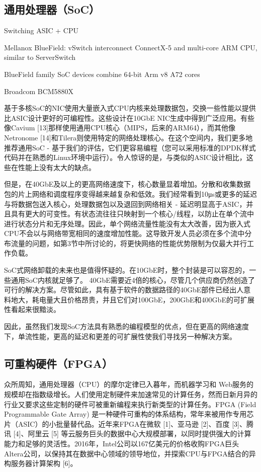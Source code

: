 \subsection{通用处理器（SoC）}
\label{smartnic-soc}

Switching ASIC + CPU

Mellanox BlueField: vSwitch interconnect ConnectX-5 and multi-core ARM CPU, similar to ServerSwitch

BlueField family SoC devices combine 64-bit Arm v8 A72 cores

Broadcom BCM5880X


基于多核SoC的NIC使用大量嵌入式CPU内核来处理数据包，交换一些性能以提供比ASIC设计更好的可编程性。这些设计在10GbE NIC生成中得到广泛应用。有些像Cavium [13]那样使用通用CPU核心（MIPS，后来的ARM64），而其他像Netronome [14]和Tilera则使用特定的网络处理核心。在这个空间内，我们更多地推荐通用SoC  - 基于我们的评估，它们更容易编程（您可以采用标准的DPDK样式代码并在熟悉的Linux环境中运行）。令人惊讶的是，与类似的ASIC设计相比，这些在性能上没有太大的缺点。

但是，在40GbE及以上的更高网络速度下，核心数量显着增加。分散和收集数据包的片上网络和调度程序变得越来越复杂和低效。我们经常看到10μs或更多的延迟与将数据包送入核心，处理数据包以及退回到网络相关 - 延迟明显高于ASIC，并且具有更大的可变性。有状态流往往只映射到一个核心/线程，以防止在单个流中进行状态分片和无序处理。因此，单个网络流量性能没有太大改善，因为嵌入式CPU不会以与网络带宽相同的速度增加性能。这导致开发人员必须在多个流中分布流量的问题，如第3节中所讨论的，将更快网络的性能优势限制为仅最大并行工作负载。

SoC式网络卸载的未来也是值得怀疑的。在10GbE时，整个封装是可以容忍的，一些通用SoC内核就足够了。 40GbE需要近4倍的核心，尽管几个供应商仍然创造了可行的解决方案。尽管如此，具有基于软件的数据路径的40GbE部件已经出人意料地大，耗电量大且价格昂贵，并且它们对100GbE，200GbE和400GbE的可扩展性看起来很黯淡。

因此，虽然我们发现SoC方法具有熟悉的编程模型的优点，但在更高的网络速度下，单流性能，更高的延迟和更差的可扩展性使我们寻找另一种解决方案。


\subsection{可重构硬件（FPGA）}
\label{smartnic-fpga}

众所周知，通用处理器（CPU）的摩尔定律已入暮年，而机器学习和 Web服务的规模却在指数级增长。人们使用定制硬件来加速常见的计算任务，然而日新月异的行业又要求这些定制的硬件可被重新编程来执行新类型的计算任务。FPGA (Field Programmable Gate Array) 是一种硬件可重构的体系结构，常年来被用作专用芯片（ASIC）的小批量替代品。近年来FPGA在微软 [1]、亚马逊 [2]、百度 [3]、腾讯 [4]、阿里云 [5] 等云服务巨头的数据中心大规模部署，以同时提供强大的计算能力和足够的灵活性。2016年，Intel公司以167亿美元的价格收购FPGA巨头Altera公司，以保持其在数据中心领域的领导地位，并探索CPU与FPGA结合的异构服务器计算架构 [6]。


